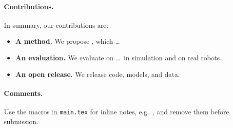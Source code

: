 \paragraph{Contributions.} In summary, our contributions are:
\begin{itemize}
    \item \textbf{A method.} We propose \method, which \dots
    \item \textbf{An evaluation.} We evaluate \method on \dots\ in simulation and on real robots.
    \item \textbf{An open release.} We release code, models, and data.
\end{itemize}

\paragraph{Comments.} Use the macros in \texttt{main.tex} for inline notes, e.g.\ , and remove them before submission.
